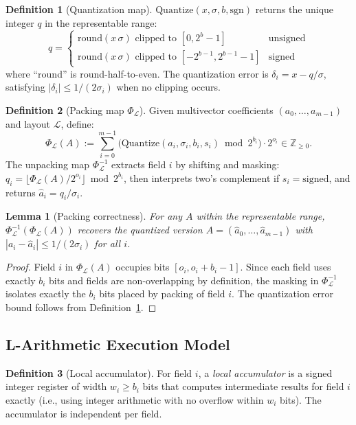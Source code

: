 \documentclass[11pt,a4paper]{article}
\theoremstyle{definition}
\newtheorem{definition}{Definition}[section]
\theoremstyle{plain}
\newtheorem{lemma}{Lemma}[section]
\theoremstyle{remark}
\newcommand{\Quantize}{\mathrm{Quantize}}
\newcommand{\Pack}{\Phi_{\mathcal{L}}}
\newcommand{\Unpack}{\Phi^{-1}_{\mathcal{L}}}
\begin{document}
\begin{definition}[Quantization map]
\label{def:quantize}
$\Quantize(x, \sigma, b, \mathrm{sgn})$ returns the unique integer $q$ in the representable range:
\[
  q = \begin{cases} \mathrm{round}(x\,\sigma) \text{ clipped to } [0, 2^b-1] & \text{unsigned} \\ \mathrm{round}(x\,\sigma) \text{ clipped to } [-2^{b-1}, 2^{b-1}-1] & \text{signed} \end{cases}
\]
where ``round'' is round-half-to-even.  The quantization error is $\delta_i = x - q/\sigma$, satisfying $|\delta_i| \le 1/(2\sigma_i)$ when no clipping occurs.
\end{definition}

\begin{definition}[Packing map $\Pack$]
\label{def:pack}
Given multivector coefficients $(a_0,\ldots,a_{m-1})$ and layout $\mathcal{L}$, define:
\[
  \Pack(A) := \sum_{i=0}^{m-1} \bigl(\Quantize(a_i, \sigma_i, b_i, s_i) \bmod 2^{b_i}\bigr) \cdot 2^{o_i} \in \mathbb{Z}_{\ge 0}.
\]
The unpacking map $\Unpack$ extracts field $i$ by shifting and masking: $q_i = \lfloor \Pack(A) / 2^{o_i} \rfloor \bmod 2^{b_i}$, then interprets two's complement if $s_i = \mathrm{signed}$, and returns $\hat{a}_i = q_i/\sigma_i$.
\end{definition}

\begin{lemma}[Packing correctness]
\label{lem:pack}
For any $A$ within the representable range, $\Unpack(\Pack(A))$ recovers the quantized version $\hat{A} = (\hat{a}_0,\ldots,\hat{a}_{m-1})$ with $|a_i - \hat{a}_i| \le 1/(2\sigma_i)$ for all $i$.
\end{lemma}
\begin{proof}
Field $i$ in $\Pack(A)$ occupies bits $[o_i, o_i+b_i-1]$.  Since each field uses exactly $b_i$ bits and fields are non-overlapping by definition, the masking in $\Unpack$ isolates exactly the $b_i$ bits placed by packing of field $i$.  The quantization error bound follows from Definition~\ref{def:quantize}.
\end{proof}

\subsection{L-Arithmetic Execution Model}

\begin{definition}[Local accumulator]
\label{def:accum}
For field $i$, a \emph{local accumulator} is a signed integer register of width $w_i \ge b_i$ bits that computes intermediate results for field $i$ exactly (i.e., using integer arithmetic with no overflow within $w_i$ bits).  The accumulator is independent per field.
\end{definition}
\end{document}
